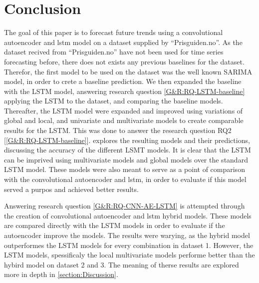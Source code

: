 \section{Conclusion}
\label{section:Discussion:Clonclusion}



The goal of this paper is to forecast future trends using a convolutional autoencoder and lstm model
on a dataset supplied by ``Prisguiden.no''.
As the dataset recived from ``Prisguiden.no'' have not been used for time series forecasting before,
there does not exists any previous baselines for the dataset.
Therefor, the first model to be used on the dataset was the well known SARIMA model,
in order to crete a baseline prediction.
We then expanded the baseline with the LSTM model, answering research question \cref{G&R:RQ-LSTM-baseline}
applying the LSTM to the dataset, and comparing the baseline models.
Thereafter, the LSTM model were expanded and improved using variations of global and local, and univariate and multivariate models
to create comparable results for the LSTM.
This was done to answer the research question RQ2 [\ref{G&R:RQ-LSTM-baseline}].
 explores the resulting models and their predictions, discussing the accuracy of the different LSMT models.
It is clear that the LSTM can be imprived using multivariate models and global models over the standard LSTM model.
These models were also meant to serve as a point of comparison with the convolutional autoencoder and lstm,
in order to evaluate if this model served a purpos and achieved better results.

Answering research question \cref{G&R:RQ-CNN-AE-LSTM} is attempted through the creation of convolutional autoencoder and lstm hybrid models.
These models are compared directly with the LSTM models in order to evaluate if the autoencoder improve the models.
The results were warying, as the hybrid model outperformes the LSTM models for every combination in dataset 1.
However, the LSTM models, spessificaly the local multivariate models performe better than the hybird model on dataset 2 and 3.
The meaning of therse results are explored more in depth in \cref{section:Discussion}.

